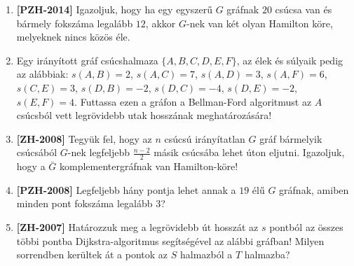 \documentclass[a4paper, 12pt]{article}
\begin{document}
\begin{enumerate}
        \item \textbf{[PZH-2014]} Igazoljuk, hogy ha egy egyszerű $G$ gráfnak $20$ csúcsa van és bármely fokszáma legalább $12$, akkor $G$-nek van két olyan Hamilton köre, melyeknek nincs közös éle.
        
        \item Egy irányított gráf csúcshalmaza $\{A,B,C,D,E,F\}$, az élek és súlyaik pedig az alábbiak: $s(A,B) = 2$, $s(A,C) = 7$, $s(A,D) = 3$, $s(A,F) = 6$, $s(C,E) = 3$, $s(D,B) = -2$, $s(D,C) = -4$, $s(D,E) = -2$, $s(E,F) = 4$. Futtassa ezen a gráfon a Bellman-Ford algoritmust az $A$ csúcsból vett legrövidebb utak hosszának meghatározására!
        \item \textbf{[ZH-2008]} Tegyük fel, hogy az $n$ csúcsú irányítatlan $G$ gráf bármelyik csúcsából $G$-nek legfeljebb $\frac{n-2}{2}$ másik csúcsába lehet úton eljutni. Igazoljuk, hogy a $\bar{G}$ komplementergráfnak van Hamilton-köre!
        \item \textbf{[PZH-2008]} Legfeljebb hány pontja lehet annak a $19$ élű $G$ gráfnak, amiben minden pont fokszáma legalább $3$?
        \item \textbf{[ZH-2007]} Határozzuk meg a legrövidebb út hosszát az $s$ pontból az összes többi pontba Dijkstra-algoritmus segítségével az alábbi gráfban! Milyen sorrendben kerültek át a pontok az $S$ halmazból a $T$ halmazba?
        \begin{figure}[!ht]
            \centering
            
        \end{figure}
        
    \end{enumerate}
\end{document}
